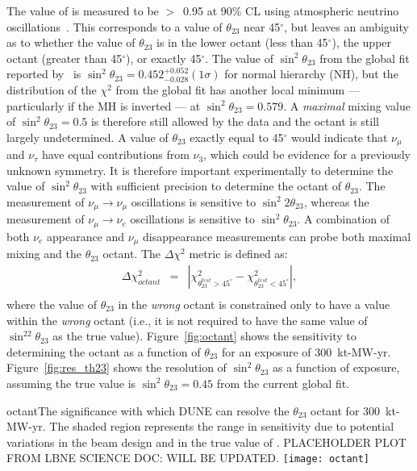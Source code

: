 The value of  is measured to be $>$~0.95 at 90\% CL 
using atmospheric neutrino oscillations~\cite{Abe:2011ph}. 
This corresponds to a value of 
$\theta_{23}$ near 45\mbox{$^{\circ}$}, but leaves an ambiguity
as to whether the value of $\theta_{23}$ is in the lower octant 
(less than 45\mbox{$^{\circ}$}), the upper octant (greater than 45\mbox{$^{\circ}$}),
or exactly 45\mbox{$^{\circ}$}. 
The value of $\sin^2 \theta_{23}$ from
the global fit reported by~\cite{Gonzalez-Garcia:2014bfa} is $\sin ^2 \theta_{23} = 0.452
^{+0.052} _{-0.028} (1 \sigma)$ for normal hierarchy (NH), but the distribution of the $\chi^2$ from
the global fit has another local minimum --- particularly if the MH 
is inverted --- at $\sin^2 \theta_{23} = 0.579$. A
\emph{maximal} mixing value of $\sin^2 \theta_{23} =0.5$ is therefore still allowed
by the data and the octant is still largely undetermined.
A value of $\theta_{23}$ exactly equal to 45\mbox{$^{\circ}$} would indicate that 
$\nu_{\mu}$ and $\nu_{\tau}$ have equal contributions from $\nu_3$,
which could be evidence for a previously unknown symmetry. 
It is
therefore important experimentally to determine the value of
$\sin ^2 \theta_{23}$ 
with sufficient precision to determine 
the octant of $\theta_{23}$. 
The measurement of $\nu_\mu \rightarrow \nu_\mu$ oscillations is
sensitive to $\sin ^2 2 \theta_{23}$, whereas the measurement of
$\nu_\mu \rightarrow \nu_e$ oscillations is sensitive to $\sin^2
\theta_{23}$. 
A combination of both $\nu_e$ appearance and $\nu_\mu$ disappearance
measurements can probe both maximal mixing and the $\theta_{23}$
octant.  The $\Delta\chi^2$ metric is defined as:
\begin{eqnarray}
\Delta\chi^2_{octant} & = & |\chi^2_{\theta_{23}^{test}>45^\circ} - \chi^2_{\theta_{23}^{test}<45^\circ}|, \\ \nonumber
\end{eqnarray}
where the value of $\theta_{23}$ in the \emph{wrong} octant is constrained 
only to have a value within the \emph{wrong} octant (i.e., it is not required
to have the same value of $\sin^22\theta_{23}$ as the true value).
Figure~\ref{fig:octant} shows the sensitivity to determining the octant as a function of $\theta_{23}$ for an exposure of 300~kt-MW-yr.  Figure~\ref{fig:res_th23} shows the resolution of $\sin^2\theta_{23}$ as a function of exposure, assuming the true value is $\sin^2\theta_{23} = 0.45$ from the current global fit.

\begin{cdrfigure}{octant}{The significance with which DUNE can resolve the $\theta_{23}$ octant for 300~kt-MW-yr. The shaded region represents the range in sensitivity due to potential variations in the beam design and in the true value of \deltacp. PLACEHOLDER PLOT FROM LBNE SCIENCE DOC: WILL BE UPDATED.}
 \texttt{[image: octant]}
\end{cdrfigure}

